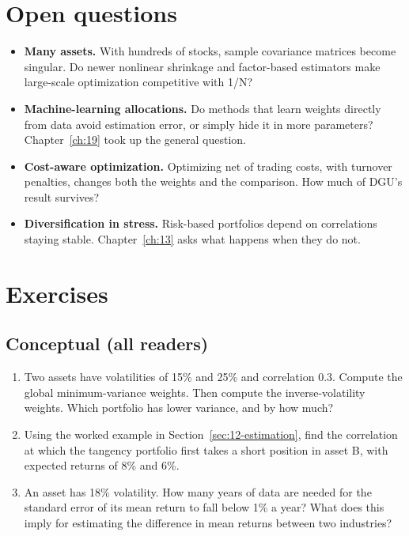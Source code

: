 \section{Open questions}
\label{sec:12-open}

\begin{itemize}
  \item \textbf{Many assets.} With hundreds of stocks, sample covariance matrices become singular. Do newer nonlinear shrinkage and factor-based estimators make large-scale optimization competitive with 1/N?
  \item \textbf{Machine-learning allocations.} Do methods that learn weights directly from data avoid estimation error, or simply hide it in more parameters? Chapter~\ref{ch:19} took up the general question.
  \item \textbf{Cost-aware optimization.} Optimizing net of trading costs, with turnover penalties, changes both the weights and the comparison. How much of DGU's result survives?
  \item \textbf{Diversification in stress.} Risk-based portfolios depend on correlations staying stable. Chapter~\ref{ch:13} asks what happens when they do not.
\end{itemize}

\section*{Exercises}

\subsection*{Conceptual (all readers)}

\begin{enumerate}
  \item Two assets have volatilities of 15\% and 25\% and correlation 0.3. Compute the global minimum-variance weights. Then compute the inverse-volatility weights. Which portfolio has lower variance, and by how much?
  \item Using the worked example in Section~\ref{sec:12-estimation}, find the correlation at which the tangency portfolio first takes a short position in asset B, with expected returns of 8\% and 6\%.
  \item An asset has 18\% volatility. How many years of data are needed for the standard error of its mean return to fall below 1\% a year? What does this imply for estimating the difference in mean returns between two industries?
\end{enumerate}

